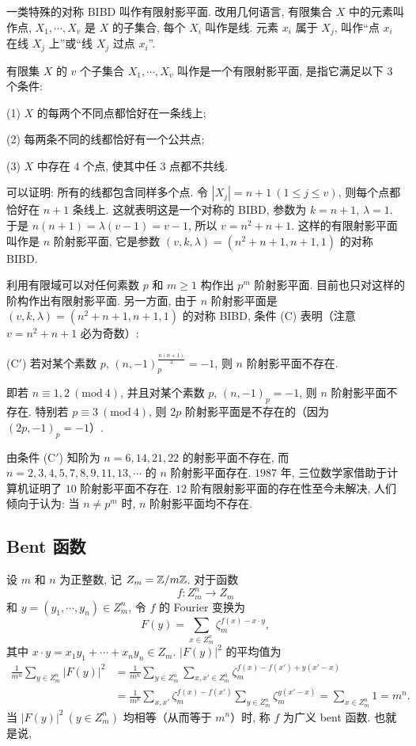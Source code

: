 一类特殊的对称 BIBD 叫作有限射影平面. 改用几何语言, 有限集合 $X$ 中的元素叫作点, $X_1,\cdots,X_v$ 是 $X$ 的子集合, 每个 $X_i$ 叫作是线. 元素 $x_i$ 属于 $X_j$, 叫作``点 $x_i$ 在线 $X_j$ 上''或``线 $X_j$ 过点 $x_i$''.

\begin{definition}\label{def:ch9-7}
有限集 $X$ 的 $v$ 个子集合 $X_1,\cdots,X_v$ 叫作是一个有限射影平面, 是指它满足以下 $3$ 个条件:

(1) $X$ 的每两个不同点都恰好在一条线上;

(2) 每两条不同的线都恰好有一个公共点;

(3) $X$ 中存在 $4$ 个点, 使其中任 $3$ 点都不共线.
\end{definition}

可以证明: 所有的线都包含同样多个点. 令 $|X_j|=n+1\ (1\leqslant j\leqslant v)$, 则每个点都恰好在 $n+1$ 条线上. 这就表明这是一个对称的 BIBD, 参数为 $k=n+1$, $\lambda=1$. 于是 $n(n+1)=\lambda(v-1)=v-1$, 所以 $v=n^2+n+1$. 这样的有限射影平面叫作是 $n$ 阶射影平面, 它是参数 $(v,k,\lambda)=(n^2+n+1,n+1,1)$ 的对称 BIBD.

利用有限域可以对任何素数 $p$ 和 $m\geqslant 1$ 构作出 $p^m$ 阶射影平面. 目前也只对这样的阶构作出有限射影平面. 另一方面, 由于 $n$ 阶射影平面是 $(v,k,\lambda)=(n^2+n+1,n+1,1)$ 的对称 BIBD, 条件 (C) 表明（注意 $v=n^2+n+1$ 必为奇数）:

(C$'$) 若对某个素数 $p$, $(n,-1)_p^{\frac{n(n+1)}{2}}=-1$, 则 $n$ 阶射影平面不存在.

即若 $n\equiv 1,2\ (\mathrm{mod}\ 4)$, 并且对某个素数 $p$, $(n,-1)_p=-1$, 则 $n$ 阶射影平面不存在. 特别若 $p\equiv 3\ (\mathrm{mod}\ 4)$, 则 $2p$ 阶射影平面是不存在的（因为 $(2p,-1)_p=-1$）.

由条件 (C$'$) 知阶为 $n=6,14,21,22$ 的射影平面不存在, 而 $n=2,3,4,5,7,8,9,11,13,\cdots$ 的 $n$ 阶射影平面存在. $1987$ 年, 三位数学家借助于计算机证明了 $10$ 阶射影平面不存在. $12$ 阶有限射影平面的存在性至今未解决, 人们倾向于认为: 当 $n\neq p^m$ 时, $n$ 阶射影平面均不存在.

\subsection{Bent 函数}

设 $m$ 和 $n$ 为正整数, 记 $Z_m=\mathbb{Z}/m\mathbb{Z}$. 对于函数
\[
  f\colon Z_m^n\to Z_m
\]
和 $y=(y_1,\cdots,y_n)\in Z_m^n$, 令 $f$ 的 Fourier 变换为
\[
  F(y)=\sum_{x\in Z_m^n}\zeta_m^{f(x)-x\cdot y},
\]
其中 $x\cdot y=x_1y_1+\cdots+x_ny_n\in Z_m$. $|F(y)|^2$ 的平均值为
\[
  \begin{aligned}
    \frac{1}{m^n}\sum_{y\in Z_m^n}|F(y)|^2
    &=\frac{1}{m^n}\sum_{y\in Z_m^n}\sum_{x,x'\in Z_m^n}
    \zeta_m^{f(x)-f(x')+y(x'-x)}\\
    &=\frac{1}{m^n}\sum_{x,x'}\zeta_m^{f(x)-f(x')}
    \sum_{y\in Z_m^n}\zeta_m^{y(x'-x)}
    =\sum_{x\in Z_m^n}1=m^n.
  \end{aligned}
\]
当 $|F(y)|^2\ (y\in Z_m^n)$ 均相等（从而等于 $m^n$）时, 称 $f$ 为广义 bent 函数. 也就是说,

